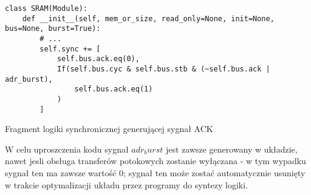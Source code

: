 \begin{listing}[H]
\begin{verbatim}
class SRAM(Module):
    def __init__(self, mem_or_size, read_only=None, init=None, bus=None, burst=True):
        # ...
        self.sync += [
            self.bus.ack.eq(0),
            If(self.bus.cyc & self.bus.stb & (~self.bus.ack | adr_burst),
                self.bus.ack.eq(1)
            )
        ]
\end{verbatim}
\caption{\label{lst:impl-sram-adrnext}Fragment logiki synchronicznej generującej sygnał ACK}
\end{listing}

W celu uproszczenia kodu sygnał $adr_burst$ jest zawsze generowany w układzie, nawet jesli obsługa transferów potokowych zostanie wyłączana - w tym wypadku sygnał ten ma zawsze wartość $0$; sygnał ten może zostać automatycznie usunięty w trakcie optymalizacji układu przez programy do syntezy logiki.
